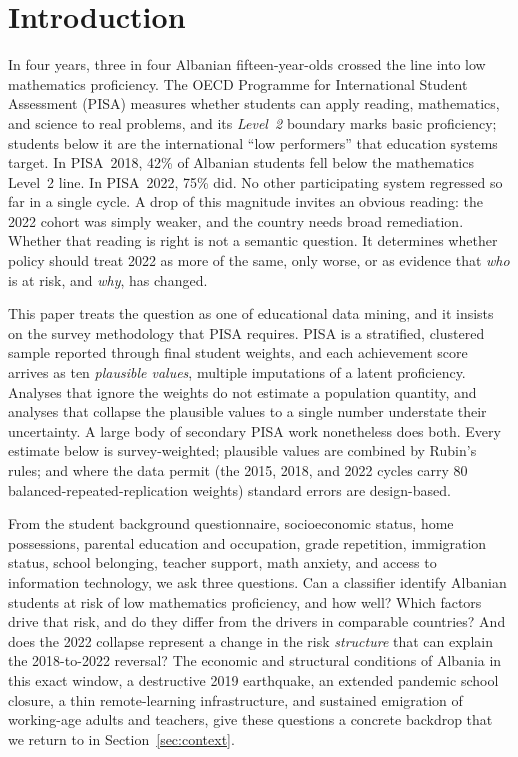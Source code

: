 \section{Introduction}

In four years, three in four Albanian fifteen-year-olds crossed the line into low
mathematics proficiency. The OECD Programme for International Student Assessment
(PISA) measures whether students can apply reading, mathematics, and science to real
problems, and its \emph{Level~2} boundary marks basic proficiency; students below it
are the international ``low performers'' that education systems target. In PISA~2018,
42\% of Albanian students fell below the mathematics Level~2 line. In PISA~2022, 75\%
did. No other participating system regressed so far in a single cycle. A drop of this
magnitude invites an obvious reading: the 2022 cohort was simply weaker, and the
country needs broad remediation. Whether that reading is right is not a semantic
question. It determines whether policy should treat 2022 as more of the same, only
worse, or as evidence that \emph{who} is at risk, and \emph{why}, has changed.

This paper treats the question as one of educational data mining, and it insists on
the survey methodology that PISA requires. PISA is a stratified, clustered sample
reported through final student weights, and each achievement score arrives as ten
\emph{plausible values}, multiple imputations of a latent proficiency. Analyses that
ignore the weights do not estimate a population quantity, and analyses that collapse
the plausible values to a single number understate their uncertainty. A large body of
secondary PISA work nonetheless does both. Every estimate below is survey-weighted;
plausible values are combined by Rubin's rules; and where the data permit (the
2015, 2018, and 2022 cycles carry 80 balanced-repeated-replication weights) standard
errors are design-based.

From the student background questionnaire, socioeconomic status, home possessions,
parental education and occupation, grade repetition, immigration status, school
belonging, teacher support, math anxiety, and access to information technology, we ask
three questions. Can a classifier identify Albanian students at risk of low
mathematics proficiency, and how well? Which factors drive that risk, and do they
differ from the drivers in comparable countries? And does the 2022 collapse represent
a change in the risk \emph{structure} that can explain the 2018-to-2022 reversal? The
economic and structural conditions of Albania in this exact window, a destructive 2019
earthquake, an extended pandemic school closure, a thin remote-learning infrastructure,
and sustained emigration of working-age adults and teachers, give these questions a
concrete backdrop that we return to in Section~\ref{sec:context}.

